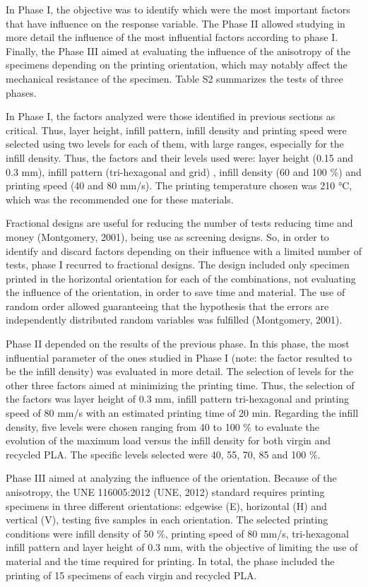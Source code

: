\documentclass[]{elsarticle} %
\begin{document}
In Phase I, the objective was to identify which were the most important
factors that have influence on the response variable. The Phase II
allowed studying in more detail the influence of the most influential
factors according to phase I. Finally, the Phase III aimed at evaluating
the influence of the anisotropy of the specimens depending on the
printing orientation, which may notably affect the mechanical resistance
of the specimen. Table S2 summarizes the tests of three phases.

In Phase I, the factors analyzed were those identified in previous
sections as critical. Thus, layer height, infill pattern, infill density
and printing speed were selected using two levels for each of them, with
large ranges, especially for the infill density. Thus, the factors and
their levels used were: layer height (0.15 and 0.3 mm), infill pattern
(tri-hexagonal and grid) , infill density (60 and 100 \%) and printing
speed (40 and 80 mm/s). The printing temperature chosen was 210 °C,
which was the recommended one for these materials.

Fractional designs are useful for reducing the number of tests reducing
time and money (Montgomery, 2001), being use as screening designs. So,
in order to identify and discard factors depending on their influence
with a limited number of tests, phase I recurred to fractional designs.
The design included only specimen printed in the horizontal orientation
for each of the combinations, not evaluating the influence of the
orientation, in order to save time and material. The use of random order
allowed guaranteeing that the hypothesis that the errors are
independently distributed random variables was fulfilled (Montgomery,
2001).

Phase II depended on the results of the previous phase. In this phase,
the most influential parameter of the ones studied in Phase I (note: the
factor resulted to be the infill density) was evaluated in more detail.
The selection of levels for the other three factors aimed at minimizing
the printing time. Thus, the selection of the factors was layer height
of 0.3 mm, infill pattern tri-hexagonal and printing speed of 80 mm/s
with an estimated printing time of 20 min. Regarding the infill density,
five levels were chosen ranging from 40 to 100 \% to evaluate the
evolution of the maximum load versus the infill density for both virgin
and recycled PLA. The specific levels selected were 40, 55, 70, 85 and
100 \%.

Phase III aimed at analyzing the influence of the orientation. Because
of the anisotropy, the UNE 116005:2012 (UNE, 2012) standard requires
printing specimens in three different orientations: edgewise (E),
horizontal (H) and vertical (V), testing five samples in each
orientation. The selected printing conditions were infill density of 50
\%, printing speed of 80 mm/s, tri-hexagonal infill pattern and layer
height of 0.3 mm, with the objective of limiting the use of material and
the time required for printing. In total, the phase included the
printing of 15 specimens of each virgin and recycled PLA.
\end{document}
